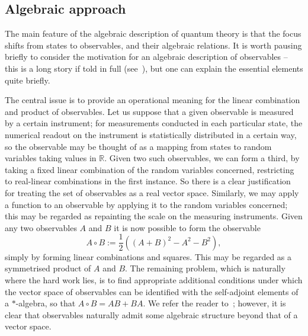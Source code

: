 \documentclass[12pt,a4paper]{article}
\newcommand{\1}{\mathds{1}}                         %
\newcommand{\RR}{\mathbb{R}}           %
\begin{document}
\subsection{Algebraic approach}\label{sec:AQM}
The main feature of the algebraic description of quantum theory is that the focus shifts from states to observables, and their algebraic relations. It is worth pausing briefly to consider the motivation for an algebraic description of observables -- this is a long story if told in full (see~\cite{Emch}), but one can explain the essential elements quite briefly. 

The central issue is to provide an operational meaning for the linear combination and product of observables. Let us suppose that a given observable is measured by a certain instrument; for measurements conducted in each particular state, the numerical readout on the instrument is statistically distributed in a certain way, so the observable may be thought of as a mapping from states to random variables taking values in $\RR$. Given two such observables, we can form a third, by taking a fixed linear combination of the random variables concerned, restricting to real-linear combinations in the first instance. So there is a clear justification for treating the set of observables as a real vector space. Similarly, we may apply a function to an observable by applying it to the random variables concerned; this may be regarded as repainting the scale on the measuring instruments. Given any
two observables $A$ and $B$ it is now possible to form the observable
\begin{equation}
A\circ B:= \frac{1}{2}\left((A+B)^2 - A^2 - B^2\right),
\end{equation} 
simply by forming linear combinations and squares. This may be regarded as a symmetrised product of $A$ and $B$. The remaining problem, which is naturally where the hard work lies, is to find appropriate additional conditions under which the vector space of observables can be identified with the self-adjoint elements of a $*$-algebra, so that $A\circ B = AB + BA$. We refer the reader to~\cite{Emch}; however, it is clear that observables naturally admit some algebraic structure beyond that of a vector space. 
\end{document}
